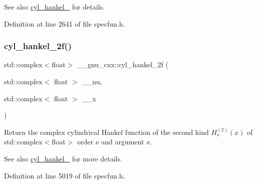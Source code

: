 \begin{DoxySeeAlso}{See also}
\hyperlink{group__gnu__math__spec__func_ga7ebc71dd48ac97255d72f5f5f43dfd8e}{cyl\+\_\+hankel\+\_} for details. 
\end{DoxySeeAlso}


Definition at line 2641 of file specfun.\+h.

\mbox{\label{group__gnu__math__spec__func_gae21f9d09b937eaf9729982da5a382f20}} 
\subsubsection{\texorpdfstring{cyl\+\_\+hankel\+\_\+2f()}{cyl\_hankel\_2f()}\hspace{0.1cm}{\footnotesize\ttfamily [2/2]}}
{\footnotesize\ttfamily std\+::complex$<$float$>$ \+\_\+\+\_\+gnu\+\_\+cxx\+::cyl\+\_\+hankel\+\_\+2f (\begin{DoxyParamCaption}\item[{std\+::complex$<$ float $>$}]{\+\_\+\+\_\+nu,  }\item[{std\+::complex$<$ float $>$}]{\+\_\+\+\_\+x }\end{DoxyParamCaption})\hspace{0.3cm}{\ttfamily [inline]}}

Return the complex cylindrical Hankel function of the second kind $ H^{(2)}_\nu(x) $ of {\ttfamily std\+::complex$<$float$>$} order $ \nu $ and argument $ x $.

\begin{DoxySeeAlso}{See also}
\hyperlink{group__gnu__math__spec__func_ga7ebc71dd48ac97255d72f5f5f43dfd8e}{cyl\+\_\+hankel\+\_} for more details. 
\end{DoxySeeAlso}


Definition at line 5019 of file specfun.\+h.

\mbox{\label{group__gnu__math__spec__func_ga4babb91ca6906f237e8bd1f0f1a10509}} 
